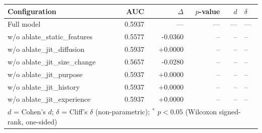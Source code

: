 \begin{tabular}{lrrrrl}
\toprule
Configuration & AUC & $\Delta$ & $p$-value & $d$ & $\delta$ \\
\midrule
Full model & 0.5937 & --- & --- & --- & --- \\
\quad w/o ablate\_static\_features & 0.5577 & -0.0360 & -- & -- & -- \\
\quad w/o ablate\_jit\_diffusion & 0.5937 & +0.0000 & -- & -- & -- \\
\quad w/o ablate\_jit\_size\_change & 0.5657 & -0.0280 & -- & -- & -- \\
\quad w/o ablate\_jit\_purpose & 0.5937 & +0.0000 & -- & -- & -- \\
\quad w/o ablate\_jit\_history & 0.5937 & +0.0000 & -- & -- & -- \\
\quad w/o ablate\_jit\_experience & 0.5937 & +0.0000 & -- & -- & -- \\
\bottomrule
\multicolumn{6}{l}{\footnotesize $d$ = Cohen's $d$;\; $\delta$ = Cliff's $\delta$ (non-parametric); $^{*}$ $p < 0.05$ (Wilcoxon signed-rank, one-sided)}
\end{tabular}